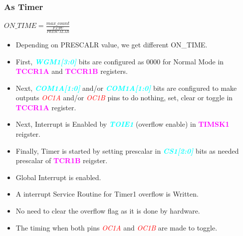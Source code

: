 \documentclass{article}
\newcommand{\bitFormat}[1]{\emph{\textbf{\textcolor{cyan}{#1}}}}
\newcommand{\regFormat}[1]{\textbf{\textcolor{magenta}{#1}}}
\newcommand{\pinFormat}[1]{\emph{\textcolor{red}{#1}}}
\begin{document}
\subsubsection{As Timer}
\begin{center}
    $ON\_TIME = \frac{max\_count}{\frac{F\_CPU}{PRESCALAR}}$
\end{center}
\begin{itemize}
    \item Depending on PRESCALR value, we get different ON\_TIME.
    \item First, \bitFormat{WGM1[3:0]} bits are configured as 0000 for Normal Mode in \regFormat{TCCR1A} and \regFormat{TCCR1B} registers.
    \item Next, \bitFormat{COM1A[1:0]} and/or \bitFormat{COM1A[1:0]} bits are configured to make outputs \pinFormat{OC1A} and/or \pinFormat{OC1B} pins to do nothing, set, clear or toggle in \regFormat{TCCR1A} register.
    \item Next, Interrupt is Enabled by \bitFormat{TOIE1} (overflow enable) in \regFormat{TIMSK1} reigster.
    \item Finally, Timer is started by setting prescalar in \bitFormat{CS1[2:0]} bits as needed prescalar of \regFormat{TCR1B} reigster.
    \item Global Interrupt is enabled.
    \item A interrupt Service Routine for Timer1 overflow is Written.
    \item No need to clear the overflow flag as it is done by hardware.
    \item The timing when both pins \pinFormat{OC1A} and \pinFormat{OC1B} are made to toggle.
\end{itemize}
\end{document}
